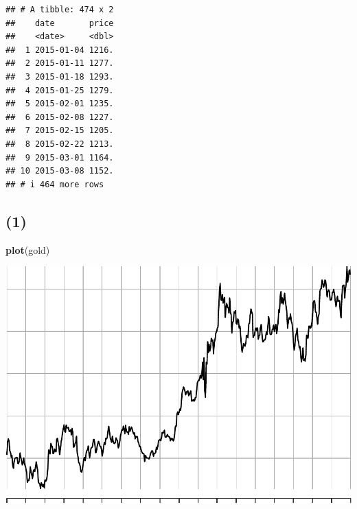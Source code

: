 \documentclass[
]{article}
\newenvironment{Shaded}{\begin{snugshade}}{\end{snugshade}}
\newcommand{\AttributeTok}[1]{\textcolor[rgb]{0.13,0.29,0.53}{#1}}
\newcommand{\FunctionTok}[1]{\textcolor[rgb]{0.13,0.29,0.53}{\textbf{#1}}}
\newcommand{\NormalTok}[1]{#1}
\newcommand{\OtherTok}[1]{\textcolor[rgb]{0.56,0.35,0.01}{#1}}
\newcommand{\SpecialCharTok}[1]{\textcolor[rgb]{0.81,0.36,0.00}{\textbf{#1}}}
\newcommand{\StringTok}[1]{\textcolor[rgb]{0.31,0.60,0.02}{#1}}
\begin{document}
\begin{Shaded}
\end{Shaded}

\begin{verbatim}
## # A tibble: 474 x 2
##    date       price
##    <date>     <dbl>
##  1 2015-01-04 1216.
##  2 2015-01-11 1277.
##  3 2015-01-18 1293.
##  4 2015-01-25 1279.
##  5 2015-02-01 1235.
##  6 2015-02-08 1227.
##  7 2015-02-15 1205.
##  8 2015-02-22 1213.
##  9 2015-03-01 1164.
## 10 2015-03-08 1152.
## # i 464 more rows
\end{verbatim}

\begin{Shaded}
\end{Shaded}

\subsection{(1)}\label{section-4}

\begin{Shaded}
\begin{Highlighting}[]
\FunctionTok{plot}\NormalTok{(gold)}
\end{Highlighting}
\end{Shaded}

\begin{center}\includegraphics[width=0.8\linewidth]{Timeseries_Analysis_HW4_files/figure-latex/unnamed-chunk-11-1} \end{center}
\end{document}
